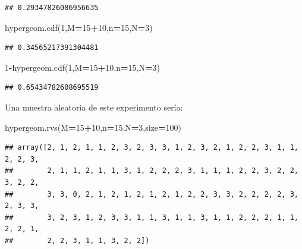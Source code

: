 \documentclass[]{book}
\newenvironment{Shaded}{\begin{snugshade}}{\end{snugshade}}
\newcommand{\DecValTok}[1]{\textcolor[rgb]{0.00,0.00,0.81}{#1}}
\newcommand{\NormalTok}[1]{#1}
\newcommand{\OperatorTok}[1]{\textcolor[rgb]{0.81,0.36,0.00}{\textbf{#1}}}
\begin{document}
\begin{verbatim}
## 0.29347826086956635
\end{verbatim}

\begin{Shaded}
\begin{Highlighting}[]
\NormalTok{hypergeom.cdf(}\DecValTok{1}\NormalTok{,M}\OperatorTok{=}\DecValTok{15}\OperatorTok{+}\DecValTok{10}\NormalTok{,n}\OperatorTok{=}\DecValTok{15}\NormalTok{,N}\OperatorTok{=}\DecValTok{3}\NormalTok{)}
\end{Highlighting}
\end{Shaded}

\begin{verbatim}
## 0.34565217391304481
\end{verbatim}

\begin{Shaded}
\begin{Highlighting}[]
\DecValTok{1}\OperatorTok{-}\NormalTok{hypergeom.cdf(}\DecValTok{1}\NormalTok{,M}\OperatorTok{=}\DecValTok{15}\OperatorTok{+}\DecValTok{10}\NormalTok{,n}\OperatorTok{=}\DecValTok{15}\NormalTok{,N}\OperatorTok{=}\DecValTok{3}\NormalTok{)}
\end{Highlighting}
\end{Shaded}

\begin{verbatim}
## 0.65434782608695519
\end{verbatim}

Una muestra aleatoria de este experimento sería:

\begin{Shaded}
\begin{Highlighting}[]
\NormalTok{hypergeom.rvs(M}\OperatorTok{=}\DecValTok{15}\OperatorTok{+}\DecValTok{10}\NormalTok{,n}\OperatorTok{=}\DecValTok{15}\NormalTok{,N}\OperatorTok{=}\DecValTok{3}\NormalTok{,size}\OperatorTok{=}\DecValTok{100}\NormalTok{)}
\end{Highlighting}
\end{Shaded}

\begin{verbatim}
## array([2, 1, 2, 1, 1, 2, 3, 2, 3, 3, 1, 2, 3, 2, 1, 2, 2, 3, 1, 1, 2, 2, 3,
##        2, 1, 1, 2, 1, 1, 3, 1, 2, 2, 2, 3, 1, 1, 1, 2, 2, 3, 2, 2, 3, 2, 2,
##        3, 3, 0, 2, 1, 2, 1, 2, 1, 2, 1, 2, 2, 3, 3, 2, 2, 2, 2, 3, 2, 3, 3,
##        3, 2, 3, 1, 2, 3, 3, 1, 1, 3, 1, 1, 3, 1, 1, 2, 2, 2, 1, 1, 2, 2, 1,
##        2, 2, 3, 1, 1, 3, 2, 2])
\end{verbatim}
\end{document}
